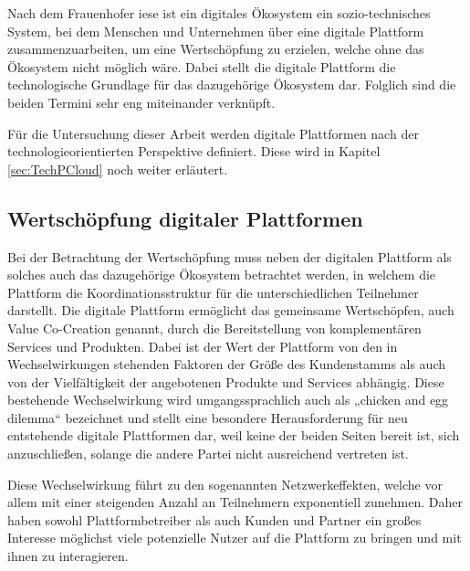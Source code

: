 Nach dem Frauenhofer \ac{iese} ist ein digitales Ökosystem ein sozio-technisches System, bei dem Menschen und Unternehmen über eine digitale Plattform zusammenzuarbeiten, um eine Wertschöpfung zu erzielen, welche ohne das Ökosystem nicht möglich wäre. \autocite[Vgl.][S. 376]{MULLERSTEWENS2019} Dabei stellt die digitale Plattform die technologische Grundlage für das dazugehörige Ökosystem dar. \autocite[Vgl.][S. 376]{IESE2021} Folglich sind die beiden Termini sehr eng miteinander verknüpft.

Für die Untersuchung dieser Arbeit werden digitale Plattformen nach der technologieorientierten Perspektive definiert. Diese wird in Kapitel \ref{sec:TechPCloud} noch weiter erläutert. 



\subsection{Wertschöpfung digitaler Plattformen}

Bei der Betrachtung der Wertschöpfung muss neben der digitalen Plattform als solches auch das dazugehörige Ökosystem betrachtet werden, in welchem die Plattform die Koordinationsstruktur für die unterschiedlichen Teilnehmer darstellt. Die digitale Plattform ermöglicht das gemeinsame Wertschöpfen, auch Value Co-Creation genannt, durch die Bereitstellung von komplementären Services und Produkten. Dabei ist der Wert der Plattform von den in Wechselwirkungen stehenden Faktoren der Größe des Kundenstamms als auch von der Vielfältigkeit der angebotenen Produkte und Services abhängig. Diese bestehende Wechselwirkung wird umgangssprachlich auch als „chicken and egg dilemma“ bezeichnet und stellt eine besondere Herausforderung für neu entstehende digitale Plattformen dar, weil keine der beiden Seiten bereit ist, sich anzuschließen, solange die andere Partei nicht ausreichend vertreten ist. \autocite[Vgl.][S. 310]{CAILLAUD2003} 

Diese Wechselwirkung führt zu den sogenannten Netzwerkeffekten, welche vor allem mit einer steigenden Anzahl an Teilnehmern exponentiell zunehmen. Daher haben sowohl Plattformbetreiber als auch Kunden und Partner ein großes Interesse möglichst viele potenzielle Nutzer auf die Plattform zu bringen und mit ihnen zu interagieren. \autocite[Vgl.][S. 596f.]{HAHN2016} 

